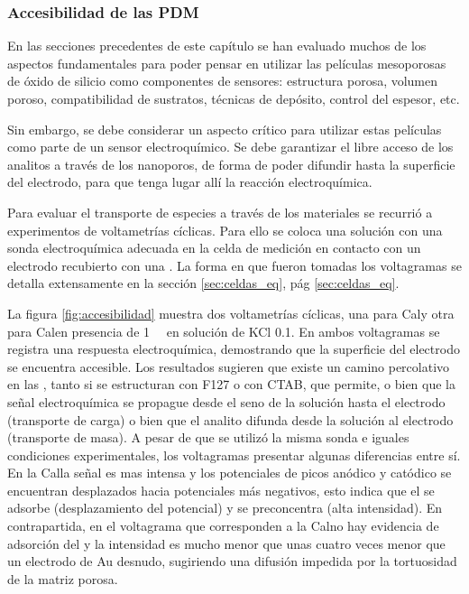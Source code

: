 	    \subsubsection{Accesibilidad de las PDM}\label{sec:acc}

			En las secciones precedentes de este capítulo se han evaluado muchos de los aspectos fundamentales para poder pensar en utilizar las películas mesoporosas de óxido de silicio como componentes de sensores: estructura porosa, volumen poroso, compatibilidad de sustratos, técnicas de depósito, control del espesor, etc.\cite{Soler-Illia2002a,Innocenzi2013,walcarius2013}

			Sin embargo, se debe considerar un aspecto crítico para utilizar estas películas como parte de un sensor electroquímico. Se debe garantizar el libre acceso de los analitos a través de los nanoporos, de forma de poder difundir hasta la superficie del electrodo, para que tenga lugar allí la reacción electroquímica.

			Para evaluar el transporte de especies a través de los materiales se recurrió a experimentos de voltametrías cíclicas. Para ello se coloca una solución con una sonda electroquímica adecuada en la celda de medición en contacto con un electrodo recubierto con una \pdm. La forma en que fueron tomadas los voltagramas se detalla extensamente en la sección \ref{sec:celdas_eq}, pág \ref{sec:celdas_eq}. 

			La figura \ref{fig:accesibilidad} muestra dos voltametrías cíclicas, una para Cal\pdmF\space y otra para Cal\pdmC\space en presencia de \aminorutenio\space \SI{1}{\milli\Molar} en solución de KCl \SI{0.1}{\Molar}. En ambos voltagramas se registra una respuesta electroquímica, demostrando que la superficie del electrodo se encuentra accesible. Los resultados sugieren que existe un camino percolativo en las \pdm, tanto si se estructuran con F127 o con CTAB, que permite, o bien que la señal electroquímica se propague desde el seno de la solución hasta el electrodo (transporte de carga) o bien que el analito difunda desde la solución al electrodo (transporte de masa). A pesar de que se utilizó la misma sonda e iguales condiciones experimentales, los voltagramas presentar algunas diferencias entre sí. En la Cal\pdmF\space la señal es mas intensa y los potenciales de picos anódico y catódico se encuentran desplazados hacia potenciales más negativos, esto indica que el \ru\space se adsorbe (desplazamiento del potencial) y se preconcentra (alta intensidad). En contrapartida, en el voltagrama que corresponden a la Cal\pdmC\space no hay evidencia de adsorción del \ru\space y la intensidad es mucho menor que unas cuatro veces menor que un electrodo de Au desnudo, sugiriendo una difusión impedida por la tortuosidad de la matriz porosa.


